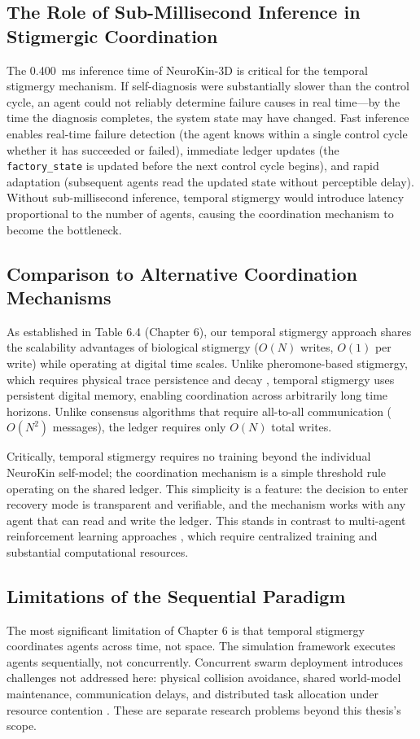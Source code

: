 \documentclass[12pt,a4paper,oneside]{report}
\begin{document}
\subsection{The Role of Sub-Millisecond Inference in Stigmergic Coordination}
The 0.400~ms inference time of NeuroKin-3D is critical for the temporal stigmergy mechanism. If self-diagnosis were substantially slower than the control cycle, an agent could not reliably determine failure causes in real time---by the time the diagnosis completes, the system state may have changed. Fast inference enables real-time failure detection (the agent knows within a single control cycle whether it has succeeded or failed), immediate ledger updates (the \texttt{factory\_state} is updated before the next control cycle begins), and rapid adaptation (subsequent agents read the updated state without perceptible delay). Without sub-millisecond inference, temporal stigmergy would introduce latency proportional to the number of agents, causing the coordination mechanism to become the bottleneck.

\subsection{Comparison to Alternative Coordination Mechanisms}
As established in Table 6.4 (Chapter 6), our temporal stigmergy approach shares the scalability advantages of biological stigmergy ($O(N)$ writes, $O(1)$ per write) while operating at digital time scales. Unlike pheromone-based stigmergy, which requires physical trace persistence and decay \cite{bongard2006resilient}, temporal stigmergy uses persistent digital memory, enabling coordination across arbitrarily long time horizons. Unlike consensus algorithms that require all-to-all communication ($O(N^2)$ messages), the ledger requires only $O(N)$ total writes.

Critically, temporal stigmergy requires no training beyond the individual NeuroKin self-model; the coordination mechanism is a simple threshold rule operating on the shared ledger. This simplicity is a feature: the decision to enter recovery mode is transparent and verifiable, and the mechanism works with any agent that can read and write the ledger. This stands in contrast to multi-agent reinforcement learning approaches \cite{domberg2026selfadapting, daneshmand2026slowrl}, which require centralized training and substantial computational resources.

\subsection{Limitations of the Sequential Paradigm}
The most significant limitation of Chapter 6 is that temporal stigmergy coordinates agents across time, not space. The simulation framework executes agents sequentially, not concurrently. Concurrent swarm deployment introduces challenges not addressed here: physical collision avoidance, shared world-model maintenance, communication delays, and distributed task allocation under resource contention \cite{matsuki2024gaussian, keetha2024splattam}. These are separate research problems beyond this thesis's scope.
\end{document}
